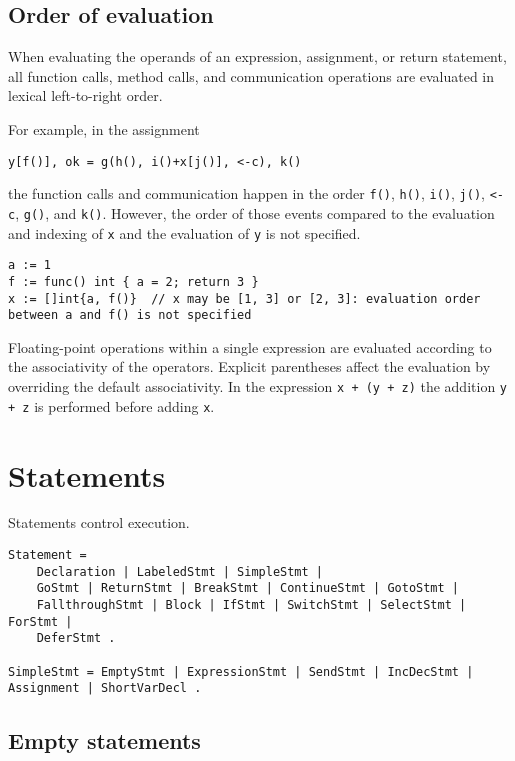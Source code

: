 {\subsection*{Order of evaluation}

When evaluating the operands of an expression,
assignment, or
return statement, all function calls,
method calls, and communication operations are evaluated in lexical
left-to-right order.

For example, in the assignment

\begin{Verbatim}[frame=single]
y[f()], ok = g(h(), i()+x[j()], <-c), k()
\end{Verbatim}

the function calls and communication happen in the order \texttt{f()},
\texttt{h()}, \texttt{i()}, \texttt{j()}, \texttt{\textless{}-c},
\texttt{g()}, and \texttt{k()}. However, the order of those events
compared to the evaluation and indexing of \texttt{x} and the evaluation
of \texttt{y} is not specified.

\begin{Verbatim}[frame=single]
a := 1
f := func() int { a = 2; return 3 }
x := []int{a, f()}  // x may be [1, 3] or [2, 3]: evaluation order between a and f() is not specified
\end{Verbatim}

Floating-point operations within a single expression are evaluated
according to the associativity of the operators. Explicit parentheses
affect the evaluation by overriding the default associativity. In the
expression \texttt{x + (y + z)} the addition \texttt{y + z} is performed
before adding \texttt{x}.

\section*{Statements}

Statements control execution.

\begin{Verbatim}[frame=single]
Statement =
    Declaration | LabeledStmt | SimpleStmt |
    GoStmt | ReturnStmt | BreakStmt | ContinueStmt | GotoStmt |
    FallthroughStmt | Block | IfStmt | SwitchStmt | SelectStmt | ForStmt |
    DeferStmt .

SimpleStmt = EmptyStmt | ExpressionStmt | SendStmt | IncDecStmt | Assignment | ShortVarDecl .
\end{Verbatim}

\subsection*{Empty statements}

}
